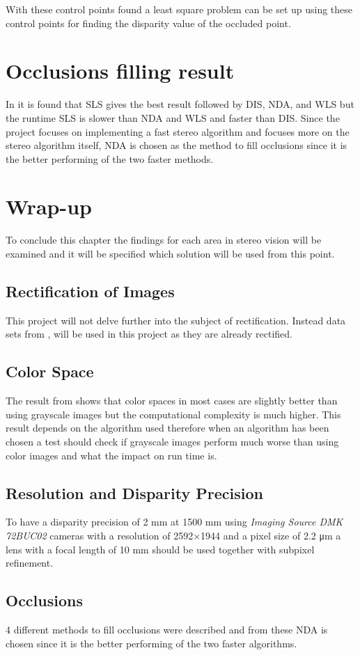 With these control points found a least square problem can be set up using these control points for finding the disparity value of the occluded point.

\section{Occlusions filling result}
In \cite{huq2013occlusion} it is found that SLS gives the best result followed by DIS, NDA, and WLS but the runtime SLS is slower than NDA and WLS and faster than DIS. Since the project focuses on implementing a fast stereo algorithm and focuses more on the stereo algorithm itself, NDA is chosen as the method to fill occlusions since it is the better performing of the two faster methods. 

\section{Wrap-up}
To conclude this chapter the findings for each area in stereo vision will be examined and it will be specified which solution will be used from this point.
\subsection*{Rectification of Images}
This project will not delve further into the subject of rectification. Instead data sets from \cite{middlebury2016}, will be used in this project as they are already rectified.

\subsection*{Color Space}
The result from \cite{chambon2005colour} shows that color spaces in most cases are slightly better than using grayscale images but the computational complexity is much higher. This result depends on the algorithm used therefore when an algorithm has been chosen a test should check if grayscale images perform much worse than using color images and what the impact on run time is.

\subsection*{Resolution and Disparity Precision}
To have a disparity precision of 2 mm at 1500 mm using \textit{Imaging Source DMK 72BUC02} cameras with a resolution of 2592$\times$1944 and a pixel size of 2.2 \si{\micro\meter} a lens with a focal length of 10 mm should be used together with subpixel refinement.

\subsection*{Occlusions}
4 different methods to fill occlusions were described and from these NDA is chosen since it is the better performing of the two faster algorithms.